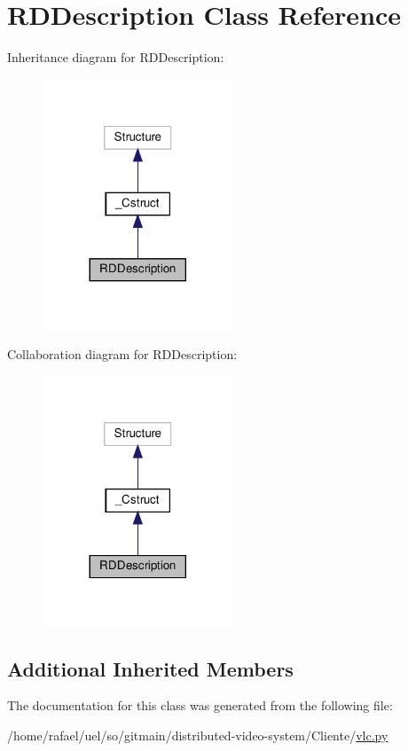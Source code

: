 \hypertarget{classvlc_1_1_r_d_description}{}\section{R\+D\+Description Class Reference}
\label{classvlc_1_1_r_d_description}


Inheritance diagram for R\+D\+Description\+:
\nopagebreak
\begin{figure}[H]
\begin{center}
\leavevmode
\includegraphics[width=161pt]{classvlc_1_1_r_d_description__inherit__graph}
\end{center}
\end{figure}


Collaboration diagram for R\+D\+Description\+:
\nopagebreak
\begin{figure}[H]
\begin{center}
\leavevmode
\includegraphics[width=161pt]{classvlc_1_1_r_d_description__coll__graph}
\end{center}
\end{figure}
\subsection*{Additional Inherited Members}


The documentation for this class was generated from the following file\+:\begin{DoxyCompactItemize}
\item 
/home/rafael/uel/so/gitmain/distributed-\/video-\/system/\+Cliente/\hyperlink{vlc_8py}{vlc.\+py}\end{DoxyCompactItemize}
